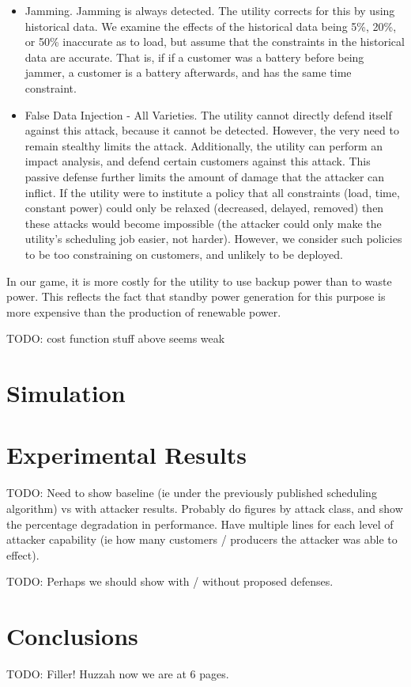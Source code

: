 \documentclass[conference]{IEEEtran}
\begin{document}
\begin{itemize}
\item Jamming.  Jamming is always detected.  The utility corrects for this by using historical data.  We examine the effects 
of the historical data being 5\%, 20\%, or 50\% inaccurate as to load, but assume that the constraints in the historical data are accurate.  That is, if if a customer was a battery before being jammer, a customer is a battery afterwards, and has the same time constraint.

\item False Data Injection - All Varieties.  The utility cannot directly defend itself against this attack, because it cannot be detected.  However, the very need to remain stealthy limits the attack.  Additionally, the utility can perform an impact analysis, and defend certain customers against this attack.  This passive defense further limits the amount of damage that the attacker can inflict.  If the utility were to institute a policy that all constraints (load, time, constant power) could only be relaxed (decreased, delayed, removed) then these attacks would become impossible (the attacker could only make the utility's scheduling job easier, not harder).  However, we consider such policies to be too constraining on customers, and unlikely to be deployed.

\end{itemize}

In our game, it is more costly for the utility to use backup power than to waste power.  This reflects the fact that standby power generation for this purpose is more expensive than the production of renewable power.

TODO: cost function stuff above seems weak

\section{Simulation}
\label{Simulation}

\section{Experimental Results}
\label{Experimental Results}

TODO: Need to show baseline (ie under the previously published scheduling algorithm) vs with attacker results.  Probably
do figures by attack class, and show the percentage degradation in performance.  Have multiple lines for each level of attacker
capability (ie how many customers / producers the attacker was able to effect).

TODO: Perhaps we should show with / without proposed defenses.


\section{Conclusions}
\label{Conclusions}

TODO:  Filler!  Huzzah now we are at 6 pages.



\end{document}
